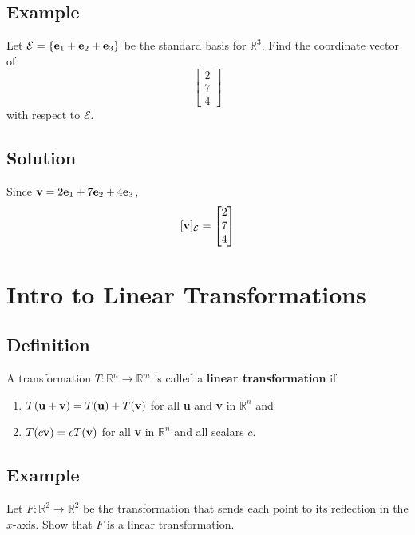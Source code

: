 \subsection*{Example}
Let $\mathcal{E}=\left\{\mathbf{e}_1+\mathbf{e}_2+\mathbf{e}_3\right\}$ be the standard basis for
$\mathbb{R}^3$. Find the coordinate vector of \[\begin{bmatrix}
        2 \\7\\4
    \end{bmatrix}\] with respect to $\mathcal{E}$.

\subsection*{Solution}
Since $\mathbf{v}=2\mathbf{e}_1+7\mathbf{e}_2+4\mathbf{e}_3$, \[[\mathbf{v}]_{\mathcal{E}}=\begin{bmatrix}
        2 \\7\\4
    \end{bmatrix}\]

\section{Intro to Linear Transformations}

\subsection*{Definition}
A transformation $T:\mathbb{R}^n\to\mathbb{R}^m$ is called a \textbf{linear transformation} if
\begin{enumerate}
    \item $T(\mathbf{u}+\mathbf{v})=T(\mathbf{u})+T(\mathbf{v})$ for all \textbf{u} and \textbf{v} in $\mathbb{R}^n$ and
    \item $T(c\mathbf{v})=cT(\mathbf{v})$ for all \textbf{v} in $\mathbb{R}^n$ and all scalars $c$.
\end{enumerate}

\subsection*{Example}
Let $F:\mathbb{R}^2\to\mathbb{R}^2$ be the transformation that sends each point to its
reflection in the $x$-axis. Show that $F$ is a linear transformation.

